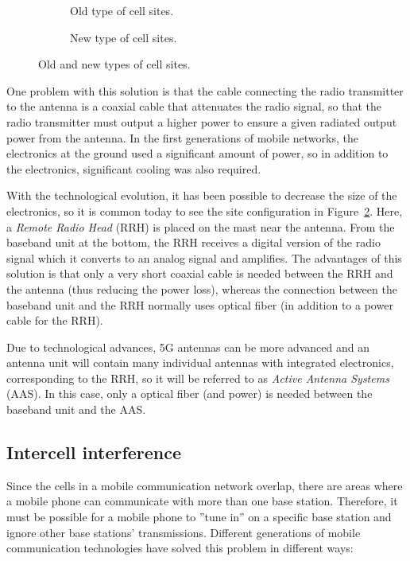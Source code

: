 \begin{figure}[htbp]
\centering
\begin{subfigure}[t]{.45\textwidth}
\centering{}
\caption{\label{fig:site_old}Old type of cell sites.}
\end{subfigure}
\begin{subfigure}[t]{.45\textwidth}
\centering{}
\caption{\label{fig:site_new}New type of cell sites.}
\end{subfigure}
\caption{\label{fig:site}Old and new types of cell sites.}
\end{figure}

One problem with this solution is that the cable connecting the radio transmitter to the antenna is a coaxial cable that attenuates the radio signal, so that the radio transmitter must output a higher power to ensure a given radiated output power from the antenna. In the first generations of mobile networks, the electronics at the ground used a significant amount of power, so in addition to the electronics, significant cooling was also required.

With the technological evolution, it has been possible to decrease the size of the electronics, so it is common today to see the site configuration in Figure~\ref{fig:site_new}. Here, a \emph{Remote Radio Head} (RRH) is placed on the mast near the antenna. From the baseband unit at the bottom, the RRH receives a digital version of the radio signal which it converts to an analog signal and amplifies. The advantages of this solution is that only a very short coaxial cable is needed between the RRH and the antenna (thus reducing the power loss), whereas the connection between the baseband unit and the RRH normally uses optical fiber (in addition to a power cable for the RRH).

Due to technological advances, 5G antennas can be more advanced and an antenna unit will contain many individual antennas with integrated electronics, corresponding to the RRH, so it will be referred to as \emph{Active Antenna Systems} (AAS). In this case, only a optical fiber (and power) is needed between the baseband unit and the AAS.
 

\subsection{Intercell interference}
Since the cells in a mobile communication network overlap, there are areas where a mobile phone can communicate with more than one base station. Therefore, it must be possible for a mobile phone to ''tune in'' on a specific base station and ignore other base stations' transmissions. Different generations of mobile communication technologies have solved this problem in different ways:

